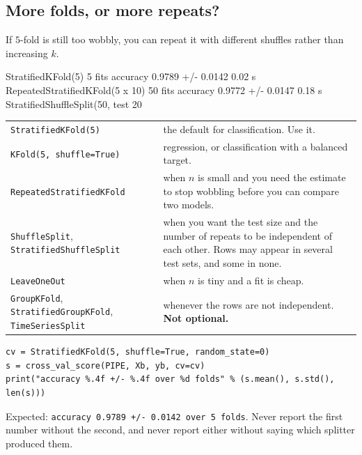 \documentclass[11pt]{article}
\begin{document}
\subsection{More folds, or more repeats?}

If $5$-fold is still too wobbly, you can repeat it with different shuffles
rather than increasing $k$.

\begin{codeout}
   StratifiedKFold(5)                       5 fits  accuracy 0.9789 +/- 0.0142    0.02 s
   RepeatedStratifiedKFold(5 x 10)         50 fits  accuracy 0.9772 +/- 0.0147    0.18 s
   StratifiedShuffleSplit(50, test 20%
\end{codeout}

\begin{center}\small
\begin{tabular}{@{}lp{9.4cm}@{}}
  \toprule
  \texttt{StratifiedKFold(5)} & the default for classification. Use it.\\
  \texttt{KFold(5, shuffle=True)} & regression, or classification with a
    balanced target.\\
  \texttt{RepeatedStratifiedKFold} & when $n$ is small and you need the
    estimate to stop wobbling before you can compare two models.\\
  \texttt{ShuffleSplit}, \texttt{StratifiedShuffleSplit} & when you want the
    test size and the number of repeats to be independent of each other. Rows
    may appear in several test sets, and some in none.\\
  \texttt{LeaveOneOut} & when $n$ is tiny and a fit is cheap.\\
  \texttt{GroupKFold}, \texttt{StratifiedGroupKFold},
    \texttt{TimeSeriesSplit} & whenever the rows are not independent.
    \textbf{Not optional.}\\
  \bottomrule
\end{tabular}
\end{center}

\begin{tryit}
\begin{lstlisting}
cv = StratifiedKFold(5, shuffle=True, random_state=0)
s = cross_val_score(PIPE, Xb, yb, cv=cv)
print("accuracy %.4f +/- %.4f over %d folds" % (s.mean(), s.std(), len(s)))
\end{lstlisting}
Expected: \texttt{accuracy 0.9789 +/- 0.0142 over 5 folds}. Never report the
first number without the second, and never report either without saying which
splitter produced them.
\end{tryit}
\end{document}
